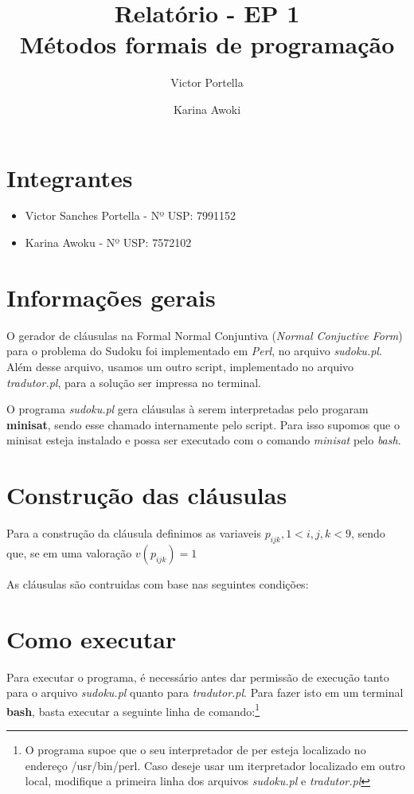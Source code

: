 \documentclass[11pt]{article}
\title{Relatório - EP 1 \\ Métodos formais de programação}
\author{Victor Portella \and Karina Awoki}
\begin{document}
\maketitle

\section{Integrantes}

\begin{itemize}

\item Victor Sanches Portella - Nº USP: 7991152

\item Karina Awoku - Nº USP: 7572102

\end{itemize}


\section{Informações gerais}

O gerador de cláusulas na Formal Normal Conjuntiva (\emph{Normal Conjuctive Form}) para o problema do Sudoku foi implementado em \emph{Perl}, no arquivo 
\emph{sudoku.pl}. Além desse arquivo, usamos um outro script, implementado no arquivo \emph{tradutor.pl}, para a solução ser impressa no terminal.

O programa \emph{sudoku.pl} gera cláusulas à serem interpretadas pelo progaram \textbf{\color{red}minisat}, sendo esse chamado internamente pelo script. Para isso supomos que o minisat esteja instalado e possa ser executado com o comando \emph{minisat} pelo \emph{bash}.


\section{Construção das cláusulas}

Para a construção da cláusula definimos as variaveis $p_{ijk}, 1< i,j,k<9$, sendo que, se em uma valoração $v(p_{ijk}) = 1 $

As cláusulas são contruidas com base nas seguintes condições:

\section{Como executar}

Para executar o programa, é necessário antes dar permissão de execução tanto para o arquivo \emph{sudoku.pl} quanto para \emph{tradutor.pl}. Para fazer isto em um terminal \textbf{\color{red}bash}, basta executar a seguinte linha de comando:\footnote{O programa supoe que o seu interpretador de per esteja localizado no endereço {\color{red}/usr/bin/perl}. Caso deseje usar um iterpretador localizado em outro local, modifique a primeira linha dos arquivos \emph{sudoku.pl} e \emph{tradutor.pl}}
\end{document}
